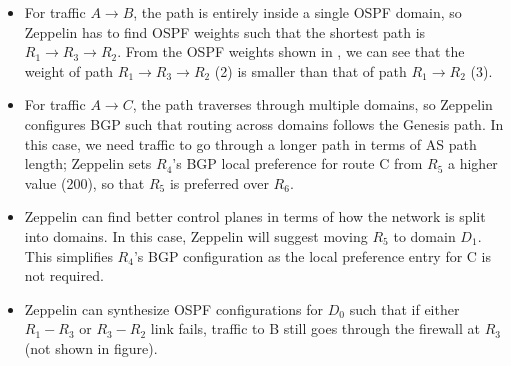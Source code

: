 \begin{itemize}
	\item
For traffic $A \rightarrow B$, the path is entirely inside
a single OSPF domain, so Zeppelin has to find OSPF weights 
such that the shortest path is $R_1 \rightarrow R_3 \rightarrow 
R_2$. From the OSPF weights shown in , 
we can see that the weight of path $R_1 
\rightarrow R_3 \rightarrow R_2$ (2) is smaller than that of path
$R_1 \rightarrow R_2$ (3). 
 	\item For traffic $A \rightarrow C$, the path traverses through 
 	multiple domains, so Zeppelin configures BGP such that 
 	routing across domains follows the Genesis path. In this case, 
 	we need traffic to go through a longer path in terms of AS path
 	length; Zeppelin sets $R_4$'s BGP local preference for route C
 	from $R_5$ a higher value (200), so that $R_5$ is 
 	preferred over $R_6$. 
 	\item Zeppelin can find better control planes in terms of how 
 	the network is split into domains. In this case,  
 	Zeppelin will suggest moving $R_5$ to domain $D_1$. 
 	This simplifies $R_4$'s BGP configuration as the local preference 
 	entry for C is not required. 
 	\item Zeppelin can synthesize OSPF configurations for $D_0$ 
 	such that if either $R_1-R_3$ or $R_3-R_2$ link fails, traffic to
 	B still goes through the firewall at $R_3$ (not shown in figure).
\end{itemize}
